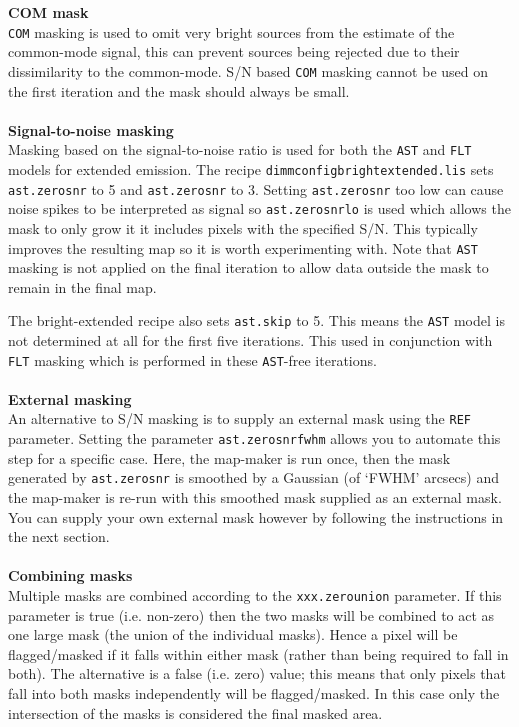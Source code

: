 \documentclass[twoside,11pt]{article}
\renewcommand{\_}{\texttt{\symbol{95}}}
\newcommand{\param}[1]{\texttt{#1}}
\newcommand{\file}[1]{\texttt{#1}}
\newcommand{\model}[1]{\texttt{#1}}
\begin{document}
\textbf{COM mask}\\
\model{COM} masking is used to omit very bright sources from the
estimate of the common-mode signal, this can prevent sources being
rejected due to their dissimilarity to the common-mode. S/N based
\model{COM} masking cannot be used on the first iteration and the
mask should always be small.
\\\\
\textbf{Signal-to-noise masking}\\
Masking based on the signal-to-noise ratio is used for both the \model{AST}
and \model{FLT} models for extended emission. The recipe
\file{dimmconfig\_bright\_extended.lis} sets \param{ast.zero\_snr}
to 5 and \param{ast.zero\_snr} to 3. Setting \param{ast.zero\_snr}
too low can cause noise spikes to be interpreted as signal so
\param{ast.zero\_snrlo} is used which allows the mask to only grow it
it includes pixels with the specified S/N. This typically improves the
resulting map so it is worth experimenting with. Note that \model{AST}
masking is not applied on the final iteration to allow data outside
the mask to remain in the final map.

The bright-extended recipe also sets \param{ast.skip} to 5. This
means the \model{AST} model is not determined at all for the first
five iterations. This used in conjunction with \model{FLT} masking
which is performed in these \model{AST}-free iterations.
\\\\
\textbf{External masking}\\
An alternative to S/N masking is to supply an external mask using the
\param{REF} parameter. Setting the parameter
\param{ast.zero\_snr\_fwhm} allows you to automate this step for a
specific case. Here, the map-maker is run once, then the mask
generated by \param{ast.zero\_snr} is smoothed by a Gaussian (of
`FWHM' arcsecs) and the map-maker is re-run with this smoothed mask
supplied as an external mask. You can supply your own external mask
however by following the instructions in the next section.
\\\\
\textbf{Combining masks}\\
Multiple masks are combined according to the \param{xxx.zero\_union}
parameter. If this parameter is true (i.e. non-zero) then the two masks
will be combined to act as one large mask (the union of the individual
masks). Hence a pixel will be flagged/masked if it falls within either
mask (rather than being required to fall in both). The alternative is
a false (i.e. zero) value; this means that only pixels that fall into
both masks independently will be flagged/masked. In this case only the
intersection of the masks is considered the final masked area.
\end{document}
